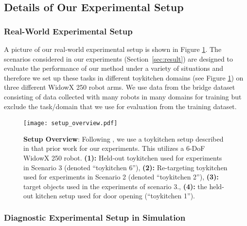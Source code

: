 \documentclass[conference]{IEEEtran}
\begin{document}
\subsection{Details of Our Experimental Setup}
\label{app:exp_setup}

\vspace{0.1cm}
\subsubsection{Real-World Experimental Setup}

A picture of our real-world experimental setup is shown in Figure \ref{fig:setup_overview}. The scenarios considered in our experiments (Section~\ref{sec:result}) are designed to evaluate the performance of our method under a variety of situations and therefore we set up these tasks in different toykitchen domains (see Figure \ref{fig:setup_overview}) on three different WidowX 250 robot arms. We use data from the bridge dataset~\citep{ebert2021bridge} consisting of data collected with many robots in many domains for training but exclude the task/domain that we use for evaluation from the training dataset.  

\begin{figure}[h]
\centering
  \texttt{[image: setup\_overview.pdf]}
  \caption{\footnotesize{\textbf{Setup Overview}: Following \citet{ebert2021bridge}, we use a toykitchen setup described in that prior work for our experiments. This utilizes a 6-DoF WidowX 250 robot. \textbf{(1):}  Held-out toykitchen used for experiments in Scenario 3 (denoted ``toykitchen 6''), \textbf{(2):}  Re-targeting toykitchen used for experiments in Scenario 2 (denoted ``toykitchen 2''), \textbf{(3):} target objects used in the experiments of scenario 3.}, \textbf{(4):} the held-out kitchen setup used for door opening (``toykitchen 1'').}
  \label{fig:setup_overview}
  \vspace{-0.3cm}
\end{figure}



\subsubsection{Diagnostic Experimental Setup in Simulation}
\label{sec:sim_appendix}
\end{document}

